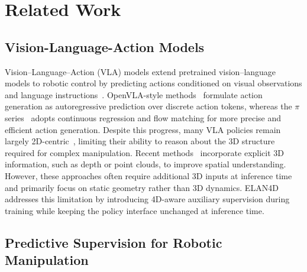 \section{Related Work}
\subsection{Vision-Language-Action Models}

Vision--Language--Action (VLA) models extend pretrained vision--language models to robotic control by predicting actions conditioned on visual observations and language instructions~\citep{kim2025openvla, black2410pi0, black2025pi, bu2025univla, zhangdreamvla, cen2025worldvla, li2025controlvla, jia2026guidedvla}. OpenVLA-style methods~\citep{kim2025openvla, bu2025univla} formulate action generation as autoregressive prediction over discrete action tokens, whereas the $\pi$ series~\citep{black2410pi0, black2025pi} adopts continuous regression and flow matching for more precise and efficient action generation. Despite this progress, many VLA policies remain largely 2D-centric~\citep{zitkovich2023rt, huvideo, brohan2022rt}, limiting their ability to reason about the 3D structure required for complex manipulation. Recent methods~\citep{li2025bridgevla, fan2026any3d, qu2025spatialvla, sun2025geovla} incorporate explicit 3D information, such as depth or point clouds, to improve spatial understanding. However, these approaches often require additional 3D inputs at inference time and primarily focus on static geometry rather than 3D dynamics. ELAN4D addresses this limitation by introducing 4D-aware auxiliary supervision during training while keeping the policy interface unchanged at inference time.

\subsection{Predictive Supervision for Robotic Manipulation}

